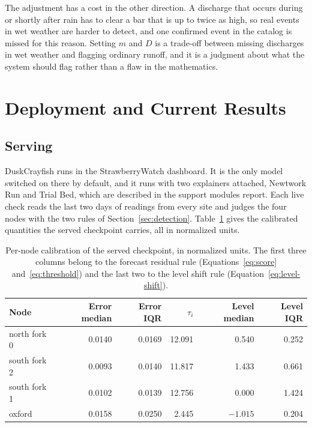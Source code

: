 \documentclass{article}
\begin{document}
The adjustment has a cost in the other direction. A discharge that occurs
during or shortly after rain has to clear a bar that is up to twice as high, so
real events in wet weather are harder to detect, and one confirmed event in the
catalog is missed for this reason. Setting $m$ and $D$ is a trade-off between
missing discharges in wet weather and flagging ordinary runoff, and it is a
judgment about what the system should flag rather than a flaw in the
mathematics.

\section{Deployment and Current Results}
\label{sec:deployment}

\subsection{Serving}
\label{sec:serving}

DuskCrayfish runs in the StrawberryWatch dashboard. It is the only model
switched on there by default, and it runs with two explainers attached,
Newtwork Run and Trial Bed, which are described in the support modules report.
Each live check reads the last two days of readings from every site and judges
the four nodes with the two rules of Section~\ref{sec:detection}.
Table~\ref{tab:serving} gives the calibrated quantities the served checkpoint
carries, all in normalized units.

\begin{table}[t]
  \centering
  \caption{Per-node calibration of the served checkpoint, in normalized units.
    The first three columns belong to the forecast residual rule
    (Equations~\ref{eq:score} and~\ref{eq:threshold}) and the last two to the
    level shift rule (Equation~\ref{eq:level-shift}).}
  \label{tab:serving}
  \begin{tabular}{lrrrrr}
    \toprule
    Node & Error median & Error IQR & $\tau_i$ & Level median & Level IQR \\
    \midrule
    north fork 0 & 0.0140 & 0.0169 & 12.091 & 0.540 & 0.252 \\
    south fork 2 & 0.0093 & 0.0140 & 11.817 & 1.433 & 0.661 \\
    south fork 1 & 0.0102 & 0.0139 & 12.756 & 0.000 & 1.424 \\
    oxford       & 0.0158 & 0.0250 & 2.445  & $-1.015$ & 0.204 \\
    \bottomrule
  \end{tabular}
\end{table}
\end{document}
